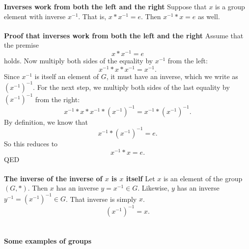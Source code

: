 \documentclass[12 pt]{article}
\newcommand{\LP}{\left(}
\newcommand{\RP}{\right)}
\numberwithin{equation}{section}
\begin{document}
\textbf{Inverses work from both the left and the right} Suppose that $x$ is a group element with inverse $x^{-1}$. That is, $x * x^{-1} = e$. Then $x^{-1} * x = e$ as well.
\\
\\
\textbf{Proof that inverses work from both the left and the right} Assume that the premise \begin{equation*}
x * x^{-1} = e
\end{equation*}
holds. Now multiply both sides of the equality by $x^{-1}$ from the left: \begin{equation*}
x^{-1} * x * x^{-1} = x^{-1}.
\end{equation*}
Since $x^{-1}$ is itself an element of $G$, it must have an inverse, which we write as $\LP x^{-1} \RP^{-1}$. For the next step, we multiply both sides of the last equality by $\LP x^{-1} \RP^{-1}$ from the right: \begin{equation*}
x^{-1} * x * x^{-1} * \LP x^{-1} \RP^{-1} = x^{-1} * \LP x^{-1} \RP^{-1}.
\end{equation*}
By definition, we know that \begin{equation*}
x^{-1} * \LP x^{-1} \RP^{-1} = e.
\end{equation*}
So this reduces to \begin{equation*}
x^{-1} * x = e.
\end{equation*}
QED
\\
\\
\textbf{The inverse of the inverse of $x$ is $x$ itself} Let $x$ is an element of the group $(G,*)$. Then $x$ has an inverse $y = x^{-1} \in G$. Likewise, $y$ has an inverse $y^{-1} = \left( x^{-1} \right)^{-1} \in G$. That inverse is simply $x$. \begin{equation*}
\left( x^{-1} \right)^{-1} = x.
\end{equation*}
\\
\\
\textbf{Some examples of groups}
\end{document}
